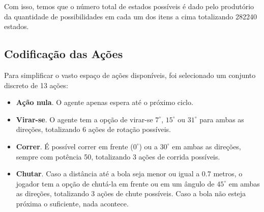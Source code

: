 Com isso, temos que o número total de estados possíveis é dado pelo produtório da quantidade de possibilidades em cada um dos itens a cima totalizando 282240 estados.

\subsection{Codificação das Ações}

Para simplificar o vasto espaço de ações disponíveis, foi selecionado um conjunto discreto de 13 ações:

\begin{itemize}
    \item \textbf{Ação nula}. O agente apenas espera até o próximo ciclo.

    \item \textbf{Virar-se}. O agente tem a opção de virar-se $7^{\circ}$, $15^{\circ}$ ou $31^{\circ}$ para ambas as direções, totalizando 6 ações de rotação possíveis. 
    
    \item \textbf{Correr}. É possível correr em frente ($0^{\circ}$) ou a $30^{\circ}$ em ambas as direções, sempre com potência 50, totalizando 3 ações de corrida possíveis.

    \item \textbf{Chutar}. Caso a distância até a bola seja menor ou igual a 0.7 metros, o jogador tem a opção de chutá-la em frente ou em um ângulo de $45^{\circ}$ em ambas as direções, totalizando 3 ações de chute possíveis. Caso a bola não esteja próxima o suficiente, nada acontece.
\end{itemize}




